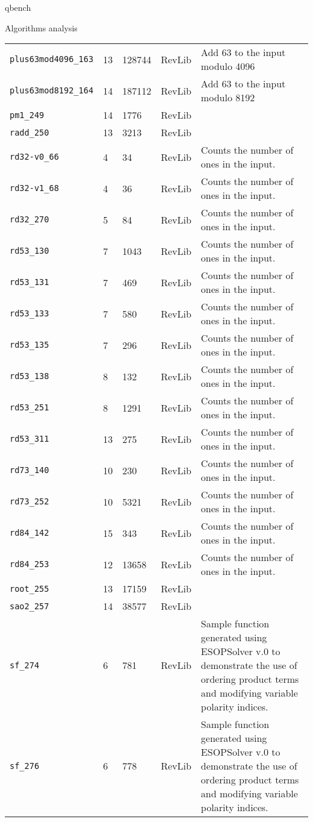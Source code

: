 \documentclass[11pt]{beamer}
\begin{document}
\begin{frame}[fragile,label={sec:org639c711}]{qbench}
\begin{block}{Algorithms analysis}
\begin{table}[htbp]
\begin{tabular}{|p{3cm}|p{1.5cm}|p{1cm}|p{1cm}|p{7.5cm}|}
\texttt{plus63mod4096\_163} & 13 & 128744 & RevLib & Add 63 to the input modulo 4096\\
\texttt{plus63mod8192\_164} & 14 & 187112 & RevLib & Add 63 to the input modulo 8192\\
\texttt{pm1\_249} & 14 & 1776 & RevLib & \\
\texttt{radd\_250} & 13 & 3213 & RevLib & \\
\texttt{rd32-v0\_66} & 4 & 34 & RevLib & Counts the number of ones in the input.\\
\texttt{rd32-v1\_68} & 4 & 36 & RevLib & Counts the number of ones in the input.\\
\texttt{rd32\_270} & 5 & 84 & RevLib & Counts the number of ones in the input.\\
\texttt{rd53\_130} & 7 & 1043 & RevLib & Counts the number of ones in the input.\\
\texttt{rd53\_131} & 7 & 469 & RevLib & Counts the number of ones in the input.\\
\texttt{rd53\_133} & 7 & 580 & RevLib & Counts the number of ones in the input.\\
\texttt{rd53\_135} & 7 & 296 & RevLib & Counts the number of ones in the input.\\
\texttt{rd53\_138} & 8 & 132 & RevLib & Counts the number of ones in the input.\\
\texttt{rd53\_251} & 8 & 1291 & RevLib & Counts the number of ones in the input.\\
\texttt{rd53\_311} & 13 & 275 & RevLib & Counts the number of ones in the input.\\
\texttt{rd73\_140} & 10 & 230 & RevLib & Counts the number of ones in the input.\\
\texttt{rd73\_252} & 10 & 5321 & RevLib & Counts the number of ones in the input.\\
\texttt{rd84\_142} & 15 & 343 & RevLib & Counts the number of ones in the input.\\
\texttt{rd84\_253} & 12 & 13658 & RevLib & Counts the number of ones in the input.\\
\texttt{root\_255} & 13 & 17159 & RevLib & \\
\texttt{sao2\_257} & 14 & 38577 & RevLib & \\
\texttt{sf\_274} & 6 & 781 & RevLib & Sample function generated using ESOPSolver v.0 to demonstrate the use of ordering product terms and modifying variable polarity indices.\\
\texttt{sf\_276} & 6 & 778 & RevLib & Sample function generated using ESOPSolver v.0 to demonstrate the use of ordering product terms and modifying variable polarity indices.\\

\end{tabular}
\end{table}
\end{block}
\end{frame}
\end{document}
